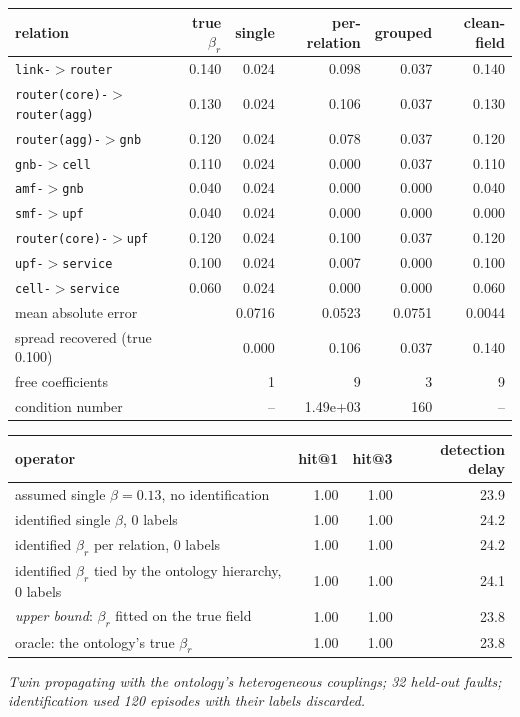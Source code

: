 \begin{center}\small\begin{tabular}{@{}lrrrrr@{}}\toprule
relation & true $\beta_r$ & single & per-relation & grouped & clean-field \\ \midrule
\texttt{link-$>$router} & 0.140 & 0.024 & 0.098 & 0.037 & 0.140 \\
\texttt{router(core)-$>$router(agg)} & 0.130 & 0.024 & 0.106 & 0.037 & 0.130 \\
\texttt{router(agg)-$>$gnb} & 0.120 & 0.024 & 0.078 & 0.037 & 0.120 \\
\texttt{gnb-$>$cell} & 0.110 & 0.024 & 0.000 & 0.037 & 0.110 \\
\texttt{amf-$>$gnb} & 0.040 & 0.024 & 0.000 & 0.000 & 0.040 \\
\texttt{smf-$>$upf} & 0.040 & 0.024 & 0.000 & 0.000 & 0.000 \\
\texttt{router(core)-$>$upf} & 0.120 & 0.024 & 0.100 & 0.037 & 0.120 \\
\texttt{upf-$>$service} & 0.100 & 0.024 & 0.007 & 0.000 & 0.100 \\
\texttt{cell-$>$service} & 0.060 & 0.024 & 0.000 & 0.000 & 0.060 \\
\midrule
mean absolute error & & 0.0716 & 0.0523 & 0.0751 & 0.0044 \\
spread recovered (true 0.100) & & 0.000 & 0.106 & 0.037 & 0.140 \\
free coefficients & & 1 & 9 & 3 & 9 \\
condition number & & -- & 1.49e+03 & 160 & -- \\
\bottomrule\end{tabular}\end{center}

\begin{center}\small\begin{tabular}{@{}lrrr@{}}\toprule
operator & hit@1 & hit@3 & detection delay \\ \midrule
assumed single $\beta=0.13$, no identification & 1.00 & 1.00 & 23.9 \\
identified single $\beta$, 0 labels & 1.00 & 1.00 & 24.2 \\
identified $\beta_r$ per relation, 0 labels & 1.00 & 1.00 & 24.2 \\
identified $\beta_r$ tied by the ontology hierarchy, 0 labels & 1.00 & 1.00 & 24.1 \\
\emph{upper bound}: $\beta_r$ fitted on the true field & 1.00 & 1.00 & 23.8 \\
oracle: the ontology's true $\beta_r$ & 1.00 & 1.00 & 23.8 \\
\bottomrule\end{tabular}\end{center}
\noindent\textit{Twin propagating with the ontology's heterogeneous couplings; 32 held-out faults; identification used 120 episodes with their labels discarded.}
